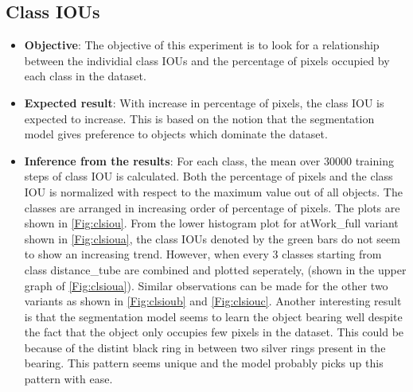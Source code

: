 	\subsection{Class IOUs}	
		\begin{itemize}
			\item \textbf{Objective}: The objective of this experiment is to look for a relationship between the individial class IOUs and the percentage of pixels occupied by each class in the dataset. 
			\item \textbf{Expected result}: With increase in percentage of pixels, the class IOU is expected to increase. This is based on the notion that the segmentation model gives preference to objects which dominate the dataset. 
			\item \textbf{Inference from the results}: For each class, the mean over 30000 training steps of class IOU is calculated. Both the percentage of pixels and the class IOU is normalized with respect to the maximum value out of all objects. The classes are arranged in increasing order of percentage of pixels. The plots are shown in \ref{Fig:clsiou}. From the lower histogram plot for atWork\_full variant shown in \ref{Fig:clsioua}, the class IOUs denoted by the green bars do not seem to show an increasing trend. However, when every 3 classes starting from class distance\_tube are combined and plotted seperately, (shown in the upper graph of \ref{Fig:clsioua}). Similar observations can be made for the other two variants as shown in \ref{Fig:clsioub} and \ref{Fig:clsiouc}. 
			Another interesting result is that the segmentation model seems to learn the object bearing well despite the fact that the object only occupies few pixels in the dataset. This could be because of the distint black ring in between two silver rings present in the bearing. This pattern seems unique and the model probably picks up this pattern with ease.
		\end{itemize}
	
